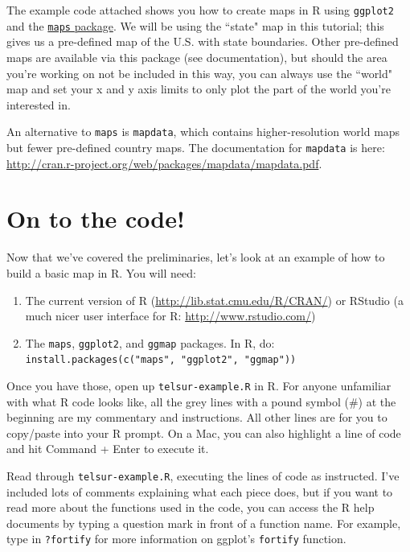 \documentclass[12pt]{article}
\begin{document}
The example code attached shows you how to create maps in R using \texttt{ggplot2} and the \href{http://cran.r-project.org/web/packages/maps/maps.pdf}{\texttt{maps} package}. We will be using the ``state" map in this tutorial; this gives us a pre-defined map of the U.S. with state boundaries. Other pre-defined maps are available via this package (see documentation), but should the area you're working on not be included in this way, you can always use the ``world" map and set your x and y axis limits to only plot the part of the world you're interested in.

An alternative to \texttt{maps} is \texttt{mapdata}, which contains higher-resolution world maps but fewer pre-defined country maps. The documentation for \texttt{mapdata} is here: \url{http://cran.r-project.org/web/packages/mapdata/mapdata.pdf}.

\section{On to the code!}
Now that we've covered the preliminaries, let's look at an example of how to build a basic map in R. You will need:
\begin{enumerate}
\item The current version of R (\url{http://lib.stat.cmu.edu/R/CRAN/}) or RStudio (a much nicer user interface for R: \url{http://www.rstudio.com/})
\item The \texttt{maps}, \texttt{ggplot2}, and \texttt{ggmap}
  packages. In R, do: \texttt{install.packages(c("maps", "ggplot2", "ggmap"))}
\end{enumerate}

Once you have those, open up \texttt{telsur-example.R} in R. For anyone unfamiliar with what R code looks like, all the grey lines with a pound symbol (\#) at the beginning are my commentary and instructions. All other lines are for you to copy/paste into your R prompt. On a Mac, you can also highlight a line of code and hit Command + Enter to execute it.

Read through \texttt{telsur-example.R}, executing the lines of code as instructed. I've included lots of comments explaining what each piece does, but if you want to read more about the functions used in the code, you can access the R help documents by typing a question mark in front of a function name. For example, type in \texttt{?fortify} for more information on ggplot’s \texttt{fortify} function.
\end{document}
